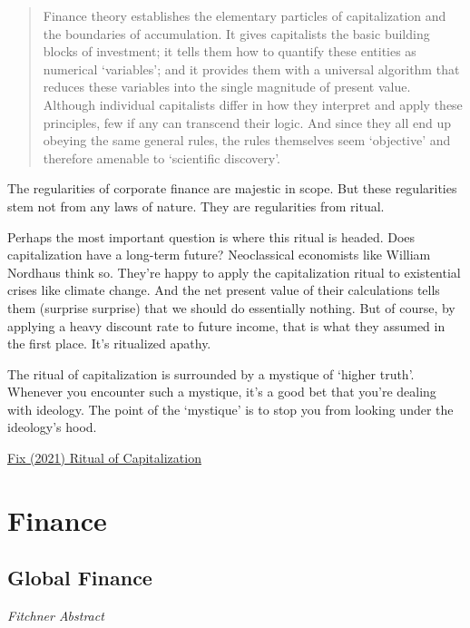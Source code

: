 \documentclass[
]{book}
\begin{document}
\begin{quote}
Finance theory establishes the elementary particles of capitalization and the boundaries of accumulation. It gives capitalists the basic building blocks of investment; it tells them how to quantify these entities as numerical `variables'; and it provides them with a universal algorithm that reduces these variables into the single magnitude of present value. Although individual capitalists differ in how they interpret and apply these principles, few if any can transcend their logic. And since they all end up obeying the same general rules, the rules themselves seem `objective' and therefore amenable to `scientific discovery'.
\end{quote}

The regularities of corporate finance are majestic in scope. But these regularities stem not from any laws of nature. They are regularities from ritual.

Perhaps the most important question is where this ritual is headed. Does capitalization have a long-term future? Neoclassical economists like William Nordhaus think so. They're happy to apply the capitalization ritual to existential crises like climate change. And the net present value of their calculations tells them (surprise surprise) that we should do essentially nothing. But of course, by applying a heavy discount rate to future income, that is what they assumed in the first place. It's ritualized apathy.

The ritual of capitalization is surrounded by a mystique of `higher truth'. Whenever you encounter such a mystique, it's a good bet that you're dealing with ideology. The point of the `mystique' is to stop you from looking under the ideology's hood.

\href{https://economicsfromthetopdown.com/2021/06/02/the-ritual-of-capitalization/}{Fix (2021) Ritual of Capitalization}

\hypertarget{finance-1}{%
\chapter{Finance}\label{finance-1}}

\hypertarget{global-finance}{%
\section{Global Finance}\label{global-finance}}

\emph{Fitchner Abstract}
\end{document}
